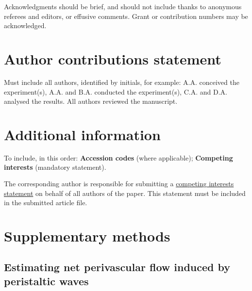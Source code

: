 \documentclass[fleqn,10pt]{wlscirep}
\begin{document}
Acknowledgments should be brief, and should not include thanks to anonymous referees and editors, or effusive comments. Grant or contribution numbers may be acknowledged.

\section*{Author contributions statement}

Must include all authors, identified by initials, for example:
A.A. conceived the experiment(s),  A.A. and B.A. conducted the experiment(s), C.A. and D.A. analysed the results.  All authors reviewed the manuscript. 

\section*{Additional information}

To include, in this order: \textbf{Accession codes} (where applicable); \textbf{Competing interests} (mandatory statement). 

The corresponding author is responsible for submitting a \href{http://www.nature.com/srep/policies/index.html#competing}{competing interests statement} on behalf of all authors of the paper. This statement must be included in the submitted article file.


\newpage
\appendix

\section{Supplementary methods}

\subsection{Estimating net perivascular flow induced by peristaltic waves}
\label{sec:sup:peristalsis}
\end{document}
